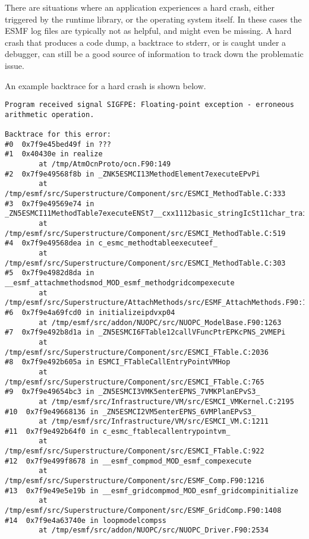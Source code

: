 There are situations where an application experiences a hard crash, either
triggered by the runtime library, or the operating system itself. In these cases
the ESMF log files are typically not as helpful, and might even be missing. A
hard crash that produces a code dump, a backtrace to stderr, or is caught under
a debugger, can still be a good source of information to track down the 
problematic issue.

An example backtrace for a hard crash is shown below.

\begin{verbatim}
Program received signal SIGFPE: Floating-point exception - erroneous arithmetic operation.

Backtrace for this error:
#0  0x7f9e45bed49f in ???
#1  0x40430e in realize
        at /tmp/AtmOcnProto/ocn.F90:149
#2  0x7f9e49568f8b in _ZNK5ESMCI13MethodElement7executeEPvPi
        at /tmp/esmf/src/Superstructure/Component/src/ESMCI_MethodTable.C:333
#3  0x7f9e49569e74 in _ZN5ESMCI11MethodTable7executeENSt7__cxx1112basic_stringIcSt11char_traitsIcESaIcEEEPvPiPb
        at /tmp/esmf/src/Superstructure/Component/src/ESMCI_MethodTable.C:519
#4  0x7f9e49568dea in c_esmc_methodtableexecuteef_
        at /tmp/esmf/src/Superstructure/Component/src/ESMCI_MethodTable.C:303
#5  0x7f9e4982d8da in __esmf_attachmethodsmod_MOD_esmf_methodgridcompexecute
        at /tmp/esmf/src/Superstructure/AttachMethods/src/ESMF_AttachMethods.F90:1278
#6  0x7f9e4a69fcd0 in initializeipdvxp04
        at /tmp/esmf/src/addon/NUOPC/src/NUOPC_ModelBase.F90:1263
#7  0x7f9e492b8d1a in _ZN5ESMCI6FTable12callVFuncPtrEPKcPNS_2VMEPi
        at /tmp/esmf/src/Superstructure/Component/src/ESMCI_FTable.C:2036
#8  0x7f9e492b605a in ESMCI_FTableCallEntryPointVMHop
        at /tmp/esmf/src/Superstructure/Component/src/ESMCI_FTable.C:765
#9  0x7f9e49654bc3 in _ZN5ESMCI3VMK5enterEPNS_7VMKPlanEPvS3_
        at /tmp/esmf/src/Infrastructure/VM/src/ESMCI_VMKernel.C:2195
#10  0x7f9e49668136 in _ZN5ESMCI2VM5enterEPNS_6VMPlanEPvS3_
        at /tmp/esmf/src/Infrastructure/VM/src/ESMCI_VM.C:1211
#11  0x7f9e492b64f0 in c_esmc_ftablecallentrypointvm_
        at /tmp/esmf/src/Superstructure/Component/src/ESMCI_FTable.C:922
#12  0x7f9e499f8678 in __esmf_compmod_MOD_esmf_compexecute
        at /tmp/esmf/src/Superstructure/Component/src/ESMF_Comp.F90:1216
#13  0x7f9e49e5e19b in __esmf_gridcompmod_MOD_esmf_gridcompinitialize
        at /tmp/esmf/src/Superstructure/Component/src/ESMF_GridComp.F90:1408
#14  0x7f9e4a63740e in loopmodelcompss
        at /tmp/esmf/src/addon/NUOPC/src/NUOPC_Driver.F90:2534

\end{verbatim}
